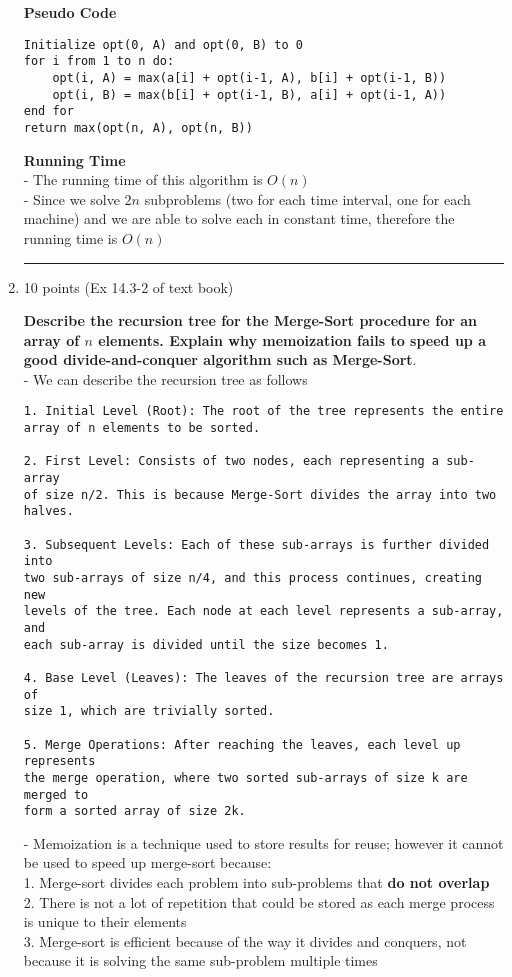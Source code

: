 \documentclass[letterpaper,12pt]{article}
\begin{document}
\begin{enumerate}
\textbf{Pseudo Code} 
\begin{verbatim}
Initialize opt(0, A) and opt(0, B) to 0
for i from 1 to n do:
    opt(i, A) = max(a[i] + opt(i-1, A), b[i] + opt(i-1, B))
    opt(i, B) = max(b[i] + opt(i-1, B), a[i] + opt(i-1, A))
end for
return max(opt(n, A), opt(n, B))
\end{verbatim}

\textbf{Running Time} \\
- The running time of this algorithm is $O(n)$ \\
- Since we solve $2n$ subproblems (two for each time interval, one for each machine) and we are able to solve each in constant time, therefore the running time is $O(n)$ \\

\noindent\rule{16cm}{0.1pt}

\item 10 points (Ex 14.3-2 of text book)

\textbf{Describe the recursion tree for the Merge-Sort procedure for an array of $n$ elements.
Explain why memoization fails to speed up a good divide-and-conquer algorithm such as 
Merge-Sort}. \\
- We can describe the recursion tree as follows
\begin{verbatim}
1. Initial Level (Root): The root of the tree represents the entire 
array of n elements to be sorted.

2. First Level: Consists of two nodes, each representing a sub-array 
of size n/2. This is because Merge-Sort divides the array into two halves.

3. Subsequent Levels: Each of these sub-arrays is further divided into 
two sub-arrays of size n/4, and this process continues, creating new 
levels of the tree. Each node at each level represents a sub-array, and 
each sub-array is divided until the size becomes 1.

4. Base Level (Leaves): The leaves of the recursion tree are arrays of 
size 1, which are trivially sorted.

5. Merge Operations: After reaching the leaves, each level up represents 
the merge operation, where two sorted sub-arrays of size k are merged to 
form a sorted array of size 2k.
\end{verbatim} 
- Memoization is a technique used to store results for reuse; however it cannot be used to speed up merge-sort because: \\
1. Merge-sort divides each problem into sub-problems that \textbf{do not overlap} \\
2. There is not a lot of repetition that could be stored as each merge process is unique to their elements \\
3. Merge-sort is efficient because of the way it divides and conquers, not because it is solving the same sub-problem multiple times


\end{enumerate}
\end{document}
